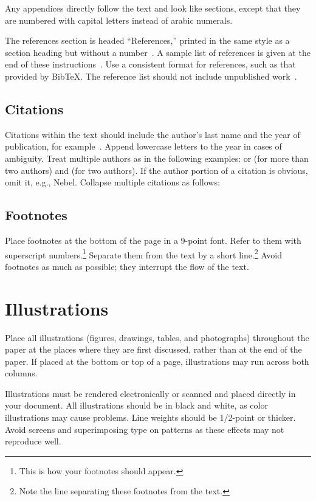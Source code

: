 \documentclass{article}
\begin{document}
Any appendices directly follow the text and look like sections, except
that they are numbered with capital letters instead of arabic
numerals.

The references section is headed ``References,'' printed in the same
style as a section heading but without a number~\cite{russell-norvig:Modern}. A sample list of
references is given at the end of these instructions~\cite{rupeneite:Reinforcement}. Use a consistent
format for references, such as that provided by Bib\TeX{}. The reference
list should not include unpublished work~\cite{trc:hs}.

\subsection{Citations}

Citations within the text should include the author's last name and
the year of publication, for example~\cite{trc:ars}.  Append
lowercase letters to the year in cases of ambiguity.  Treat multiple
authors as in the following examples:
or (for more than two authors) and (for two authors).  If the author
portion of a citation is obvious, omit it, e.g.,
Nebel.  Collapse multiple citations as
follows:
~\cite{trc:ars}
~\cite{trc:hs}
~\cite{rupeneite:Reinforcement}
~\cite{russell-norvig:Modern}
~\cite{sqas:replay}

\subsection{Footnotes}

Place footnotes at the bottom of the page in a 9-point font.  Refer to
them with superscript numbers.\footnote{This is how your footnotes
should appear.} Separate them from the text by a short
line.\footnote{Note the line separating these footnotes from the
text.} Avoid footnotes as much as possible; they interrupt the flow of
the text.

\section{Illustrations}

Place all illustrations (figures, drawings, tables, and photographs)
throughout the paper at the places where they are first discussed,
rather than at the end of the paper. If placed at the bottom or top of
a page, illustrations may run across both columns.

Illustrations must be rendered electronically or scanned and placed
directly in your document. All illustrations should be in black and
white, as color illustrations may cause problems. Line weights should
be 1/2-point or thicker. Avoid screens and superimposing type on
patterns as these effects may not reproduce well.
\end{document}
